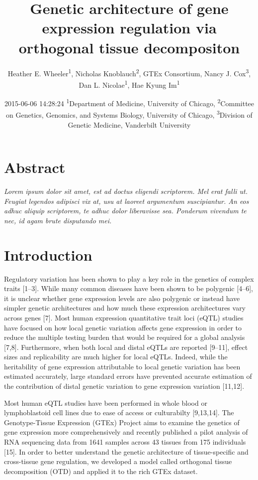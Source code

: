 \documentclass[]{article}
\title{Genetic architecture of gene expression regulation via orthogonal tissue
decompositon}
\author{Heather E. Wheeler\textsuperscript{1}, Nicholas
Knoblauch\textsuperscript{2}, GTEx Consortium, Nancy J.
Cox\textsuperscript{3}, Dan L. Nicolae\textsuperscript{1}, Hae Kyung
Im\textsuperscript{1}}
\date{2015-06-06 14:28:24 \textsuperscript{1}Department of Medicine,
University of Chicago, \textsuperscript{2}Committee on Genetics,
Genomics, and Systems Biology, University of Chicago,
\textsuperscript{3}Division of Genetic Medicine, Vanderbilt University}
\begin{document}
\maketitle


\section{Abstract}\label{abstract}

\emph{Lorem ipsum dolor sit amet, est ad doctus eligendi scriptorem. Mel
erat falli ut. Feugiat legendos adipisci vix at, usu at laoreet
argumentum suscipiantur. An eos adhuc aliquip scriptorem, te adhuc dolor
liberavisse sea. Ponderum vivendum te nec, id agam brute disputando
mei.}

\section{Introduction}\label{introduction}

Regulatory variation has been shown to play a key role in the genetics
of complex traits {[}1--3{]}. While many common diseases have been shown
to be polygenic {[}4--6{]}, it is unclear whether gene expression levels
are also polygenic or instead have simpler genetic architectures and how
much these expression architectures vary across genes {[}7{]}. Most
human expression quantitative trait loci (eQTL) studies have focused on
how local genetic variation affects gene expression in order to reduce
the multiple testing burden that would be required for a global analysis
{[}7,8{]}. Furthermore, when both local and distal eQTLs are reported
{[}9--11{]}, effect sizes and replicability are much higher for local
eQTLs. Indeed, while the heritability of gene expression attributable to
local genetic variation has been estimated accurately, large standard
errors have prevented accurate estimation of the contribution of distal
genetic variation to gene expression variation {[}11,12{]}.

Most human eQTL studies have been performed in whole blood or
lymphoblastoid cell lines due to ease of access or culturabilty
{[}9,13,14{]}. The Genotype-Tissue Expression (GTEx) Project aims to
examine the genetics of gene expression more comprehensively and
recently published a pilot analysis of RNA sequencing data from 1641
samples across 43 tissues from 175 individuals {[}15{]}. In order to
better understand the genetic architecture of tissue-specific and
cross-tissue gene regulation, we developed a model called orthogonal
tissue decomposition (OTD) and applied it to the rich GTEx dataset.
\end{document}
